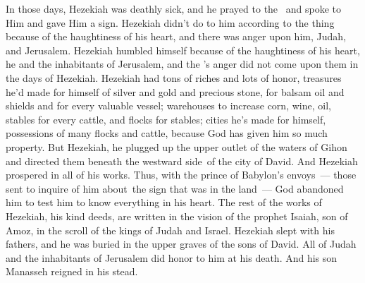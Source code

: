\begin{inparaenum}
   In those days, Hezekiah was deathly sick, and he prayed to the \lord\ and spoke to Him and gave Him a sign.%
   Hezekiah didn't do to him according to the thing because of the haughtiness of his heart, and there was anger upon him, Judah, and Jerusalem.%
   Hezekiah humbled himself because of the haughtiness of his heart, he and the inhabitants of Jerusalem, and the \lord's anger did not come upon them in the days of Hezekiah.%
   Hezekiah had tons of riches and lots of honor, treasures he'd made for himself of silver and gold and precious stone, for balsam oil and shields and for every valuable vessel;%
   warehouses to increase corn, wine, oil, stables for every cattle, and flocks for stables;%
   cities he's made for himself, possessions of many flocks and cattle, because God has given him so much property.%
   But Hezekiah, he plugged up the upper outlet of the waters of Gihon and directed them beneath the westward side\understood\ of the city of David. And Hezekiah prospered in all of his works.%
   Thus, with the prince of Babylon's envoys~--- those sent to inquire of him about\understood\ the sign that was in the land~--- God abandoned him to test him to know everything in his heart.%
   The rest of the works of Hezekiah, his kind deeds, are written in the vision of the prophet Isaiah, son of Amoz, in the scroll of the kings of Judah and Israel.%
   Hezekiah slept with his fathers, and he was buried in the upper graves of the sons of David. All of Judah and the inhabitants of Jerusalem did honor to him at his death. And his son Manasseh reigned in his stead.%
\end{inparaenum}
